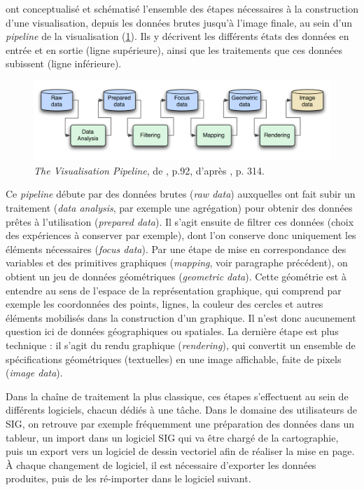 \textcite{dos_santos_gaining_2004} ont conceptualisé et schématisé l'ensemble des étapes nécessaires à la construction d'une visualisation, depuis les données brutes jusqu'à l'image finale, au sein d'un \og \textit{pipeline}\fg{} de la visualisation (\cref{fig:visualisation-pipeline}).
Ils y décrivent les différents états des données en entrée et en sortie (ligne supérieure), ainsi que les traitements que ces données subissent (ligne inférieure).

\begin{figure}[H]
	\centering
	\includegraphics[width=\linewidth]{img/Visualisation_Pipeline_p92.png}
	\caption{\og \textit{The Visualisation Pipeline}\fg{}, de \textcite{keim_mastering_2010}, p.92, d'après \textcite{dos_santos_gaining_2004}, p. 314.}
	\label{fig:visualisation-pipeline}
\end{figure}

Ce \textit{pipeline} débute par des données brutes (\textit{raw data}) auxquelles ont fait subir un traitement (\textit{data analysis}, par exemple une agrégation) pour obtenir des données prêtes à l'utilisation (\textit{prepared data}).
Il s'agit ensuite de filtrer ces données (choix des expériences à conserver par exemple), dont l'on conserve donc uniquement les éléments nécessaires (\textit{focus data}).
Par une étape de mise en correspondance des variables et des primitives graphiques (\textit{mapping}, voir paragraphe précédent), on obtient un jeu de données \og géométriques \fg{} (\textit{geometric data}).
Cette \og géométrie\fg{} est à entendre au sens de l'espace de la représentation graphique, qui comprend par exemple les coordonnées des points, lignes, la couleur des cercles et autres éléments mobilisés dans la construction d'un graphique.
Il n'est donc aucunement question ici de données géographiques ou spatiales.
La dernière étape est plus technique : il s'agit du \og rendu graphique\fg{} (\textit{rendering}), qui convertit un ensemble de spécifications géométriques (textuelles) en une image affichable, faite de pixels (\textit{image data}).

Dans la chaîne de traitement la plus classique, ces étapes s'effectuent au sein de différents logiciels, chacun dédiés à une tâche. Dans le domaine des utilisateurs de SIG, on retrouve par exemple fréquemment une préparation des données dans un tableur, un import dans un logiciel SIG qui va être chargé de la cartographie, puis un export vers un logiciel de dessin vectoriel afin de réaliser la mise en page.
À chaque changement de logiciel, il est nécessaire d'exporter les données produites, puis de les ré-importer dans le logiciel suivant.

